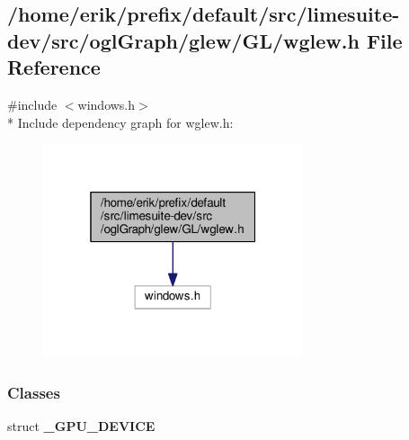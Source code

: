 \subsection{/home/erik/prefix/default/src/limesuite-\/dev/src/ogl\+Graph/glew/\+G\+L/wglew.h File Reference}
\label{wglew_8h}
{\ttfamily \#include $<$windows.\+h$>$}\\*
Include dependency graph for wglew.\+h\+:
\nopagebreak
\begin{figure}[H]
\begin{center}
\leavevmode
\includegraphics[width=217pt]{d9/df1/wglew_8h__incl}
\end{center}
\end{figure}
\subsubsection*{Classes}
\begin{DoxyCompactItemize}
\item 
struct {\bf \+\_\+\+G\+P\+U\+\_\+\+D\+E\+V\+I\+CE}
\end{DoxyCompactItemize}
